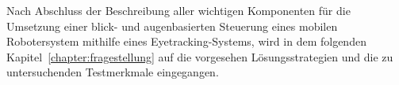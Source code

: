 Nach Abschluss der Beschreibung aller wichtigen Komponenten für die Umsetzung einer blick- und augenbasierten Steuerung eines mobilen Robotersystem mithilfe eines Eyetracking-Systems, wird in dem folgenden Kapitel~\ref{chapter:fragestellung} auf die vorgesehen Lösungsstrategien und die zu untersuchenden Testmerkmale eingegangen. 






